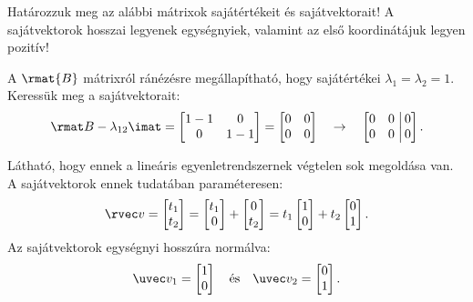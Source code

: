 \begin{exercise}{%
    Határozzuk meg az alábbi mátrixok sajátértékeit és sajátvektorait!
    A sajátvektorok hosszai legyenek egységnyiek, valamint az első koordinátájuk
    legyen pozitív!
  }
{  A $\rmat{B}$ mátrixról ránézésre megállapítható, hogy sajátértékei $\lambda_1
    = \lambda_2 = 1$. Keressük meg a sajátvektorait:
  \[
    \rmat B - \lambda_{12} \imat = \begin{bmatrix}
      1 - 1 & 0     \\
      0     & 1 - 1
    \end{bmatrix} = \begin{bmatrix}
      0 & 0 \\
      0 & 0
    \end{bmatrix}
    \quad \rightarrow \quad
    \left[\begin{matrix}
        0 & 0 \\
        0 & 0
      \end{matrix}\right.\left|\begin{matrix}
        \,0 \\ \,0
      \end{matrix}\right]
    \text.
  \]

  Látható, hogy ennek a lineáris egyenletrendszernek végtelen sok megoldása van.
  A sajátvektorok ennek tudatában paraméteresen:
  \[
    \rvec v = \begin{bmatrix}
      t_1 \\ t_2
    \end{bmatrix} = \begin{bmatrix}
      t_1 \\ 0
    \end{bmatrix} + \begin{bmatrix}
      0 \\ t_2
    \end{bmatrix} = t_1 \begin{bmatrix}
      1 \\ 0
    \end{bmatrix} + t_2 \begin{bmatrix}
      0 \\ 1
    \end{bmatrix}
    \text{.}
  \]
  Az sajátvektorok egységnyi hosszúra normálva:
  \[
    \uvec v_1 = \begin{bmatrix}
      1 \\ 0
    \end{bmatrix}
    \quad \text{és} \quad
    \uvec v_2 = \begin{bmatrix}
      0 \\ 1
    \end{bmatrix}
    \text{.}
  \]
  }
\end{exercise}
